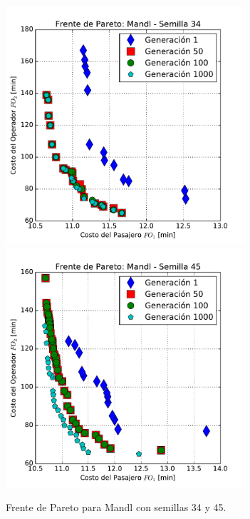 \begin{figure}[p]
\centering
\includegraphics[width=0.79\textwidth]{img/frente_Mandl_s34}
\includegraphics[width=0.79\textwidth]{img/frente_Mandl_s45}
\caption{Frente de Pareto para Mandl con semillas 34 y 45.}
\label{fig:paretoMandl2}
\end{figure}

